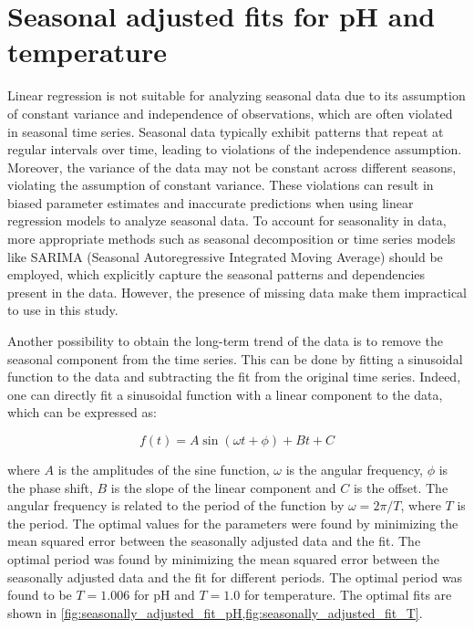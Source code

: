 \section{Seasonal adjusted fits for pH and temperature }

Linear regression is not suitable for analyzing seasonal data due to its
assumption of constant variance and independence of observations, which are
often violated in seasonal time series. Seasonal data typically exhibit
patterns that repeat at regular intervals over time, leading to violations of
the independence assumption. Moreover, the variance of the data may not be
constant across different seasons, violating the assumption of constant
variance. These violations can result in biased parameter estimates and
inaccurate predictions when using linear regression models to analyze seasonal
data. To account for seasonality in data, more appropriate methods such as
seasonal decomposition or time series models like SARIMA (Seasonal
Autoregressive Integrated Moving Average) should be employed, which explicitly
capture the seasonal patterns and dependencies present in the data. However,
the presence of missing data make them impractical to use in this study.

Another possibility to obtain the long-term trend of the data is to remove the
seasonal component from the time series. This can be done by fitting a
sinusoidal function to the data and subtracting the fit from the original time
series. Indeed, one can directly fit a sinusoidal function with a linear
component to the data, which can be expressed as:

\begin{equation}
    f(t) = A \sin(\omega t + \phi) + Bt  + C
\end{equation}

where $A$ is the amplitudes of the sine function, $\omega$ is the angular
frequency, $\phi$ is the phase shift, $B$ is the slope of the linear component
and $C$ is the offset. The angular frequency is related to the period of the
function by $\omega = 2\pi/T$, where $T$ is the period. The optimal values for
the parameters were found by minimizing the mean squared error between the
seasonally adjusted data and the fit. The optimal period was found by
minimizing the mean squared error between the seasonally adjusted data and the
fit for different periods. The optimal period was found to be $T=1.006$ for pH
and $T=1.0$ for temperature. The optimal fits are shown in
\cref{fig:seasonally_adjusted_fit_pH,fig:seasonally_adjusted_fit_T}.

